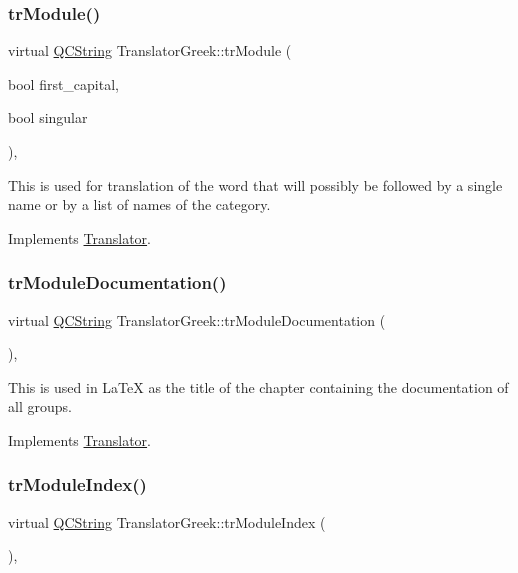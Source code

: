 \subsubsection{\texorpdfstring{trModule()}{trModule()}}
{\footnotesize\ttfamily virtual \mbox{\hyperlink{class_q_c_string}{Q\+C\+String}} Translator\+Greek\+::tr\+Module (\begin{DoxyParamCaption}\item[{bool}]{first\+\_\+capital,  }\item[{bool}]{singular }\end{DoxyParamCaption})\hspace{0.3cm}{\ttfamily [inline]}, {\ttfamily [virtual]}}

This is used for translation of the word that will possibly be followed by a single name or by a list of names of the category. 

Implements \mbox{\hyperlink{class_translator}{Translator}}.

\mbox{\label{class_translator_greek_ad8b6ccefccf8d6a87af8437148d3156a}} 
\subsubsection{\texorpdfstring{trModuleDocumentation()}{trModuleDocumentation()}}
{\footnotesize\ttfamily virtual \mbox{\hyperlink{class_q_c_string}{Q\+C\+String}} Translator\+Greek\+::tr\+Module\+Documentation (\begin{DoxyParamCaption}{ }\end{DoxyParamCaption})\hspace{0.3cm}{\ttfamily [inline]}, {\ttfamily [virtual]}}

This is used in La\+TeX as the title of the chapter containing the documentation of all groups. 

Implements \mbox{\hyperlink{class_translator}{Translator}}.

\mbox{\label{class_translator_greek_a5177542dcd2672621da881ca54bf5a96}} 
\subsubsection{\texorpdfstring{trModuleIndex()}{trModuleIndex()}}
{\footnotesize\ttfamily virtual \mbox{\hyperlink{class_q_c_string}{Q\+C\+String}} Translator\+Greek\+::tr\+Module\+Index (\begin{DoxyParamCaption}{ }\end{DoxyParamCaption})\hspace{0.3cm}{\ttfamily [inline]}, {\ttfamily [virtual]}}

